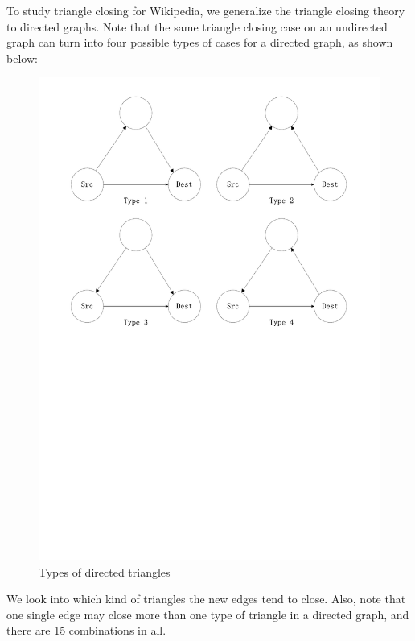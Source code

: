 \documentclass[10pt,twocolumn]{article}
\begin{document}
To study triangle closing for Wikipedia, we generalize the triangle closing theory to directed graphs. Note that the same triangle closing case on an undirected graph can turn into four possible types of cases for a directed graph, as shown below: 
\begin{figure}[ht]
    \centering
        \includegraphics[scale = 0.35, trim = 2cm 14cm 2cm 1cm,clip=true]{./graphs/triangles.pdf}
    \caption{Types of directed triangles} \label{fig:triangles}
\end{figure}
We look into which kind of triangles the new edges tend to close. Also, note that one single edge may close more than one type of triangle in a directed graph, and there are 15 combinations in all. 
\end{document}
